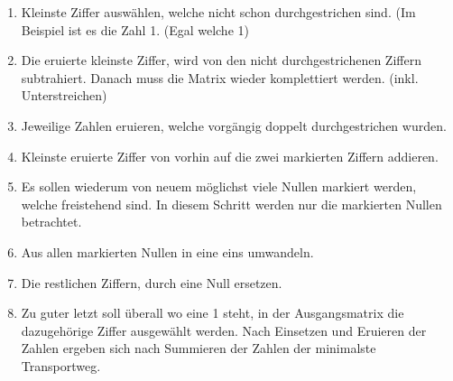 \begin{enumerate}
\item Kleinste Ziffer auswählen, welche nicht schon durchgestrichen sind.
(Im Beispiel ist es die Zahl 1. (Egal welche 1)

\item Die eruierte kleinste Ziffer, wird von den nicht durchgestrichenen Ziffern
subtrahiert. Danach muss die Matrix wieder komplettiert werden. (inkl. Unterstreichen)

\item Jeweilige Zahlen eruieren, welche vorgängig doppelt durchgestrichen wurden.

\item Kleinste eruierte Ziffer von vorhin auf die zwei markierten Ziffern addieren.

\item Es sollen wiederum von neuem möglichst viele Nullen markiert werden,
welche freistehend sind. In diesem Schritt werden nur die markierten Nullen betrachtet.

\item Aus allen markierten Nullen in eine eins umwandeln.

\item Die restlichen Ziffern, durch eine Null ersetzen.

\item Zu guter letzt soll überall wo eine 1 steht, in der Ausgangsmatrix die
dazugehörige Ziffer ausgewählt werden. Nach Einsetzen und Eruieren der Zahlen ergeben sich nach Summieren der Zahlen der minimalste Transportweg.
\end{enumerate}

